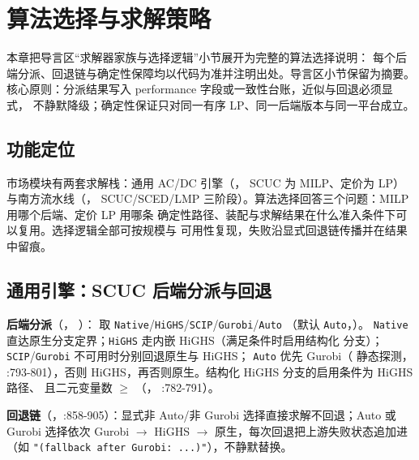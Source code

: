 \section{算法选择与求解策略}\label{sec:algorithm-selection}

\begin{theorynote}
本章把导言区“求解器家族与选择逻辑”小节展开为完整的算法选择说明：
每个后端分派、回退链与确定性保障均以代码为准并注明出处。导言区小节保留为摘要。
核心原则：分派结果写入 performance 字段或一致性台账，近似与回退必须显式，
不静默降级；确定性保证只对同一有序 LP、同一后端版本与同一平台成立。
\end{theorynote}

\subsection{功能定位}
市场模块有两套求解栈：通用 AC/DC 引擎（，
SCUC 为 MILP、定价为 LP）与南方流水线（，
SCUC/SCED/LMP 三阶段）。算法选择回答三个问题：MILP 用哪个后端、定价 LP 用哪条
确定性路径、装配与求解结果在什么准入条件下可以复用。选择逻辑全部可按规模与
可用性复现，失败沿显式回退链传播并在结果中留痕。

\subsection{通用引擎：SCUC 后端分派与回退}
\textbf{后端分派}（，
）： 取
\texttt{Native}/\texttt{HiGHS}/\texttt{SCIP}/\texttt{Gurobi}/\texttt{Auto}
（默认 \texttt{Auto}，）。
\texttt{Native} 直达原生分支定界；\texttt{HiGHS} 走内嵌 HiGHS（满足条件时启用结构化
分支）；\texttt{SCIP}/\texttt{Gurobi} 不可用时分别回退原生与 HiGHS；
\texttt{Auto} 优先 Gurobi（ 静态探测，
:793-801），否则 HiGHS，再否则原生。结构化 HiGHS 分支的启用条件为
HiGHS 路径、 且二元变量数 $\ge$
（，
:782-791）。

\textbf{回退链}（，:858-905）：显式非
Auto/非 Gurobi 选择直接求解不回退；Auto 或 Gurobi 选择依次
Gurobi $\to$ HiGHS $\to$ 原生，每次回退把上游失败状态追加进
（如 \texttt{"(fallback after Gurobi: ...)"}），不静默替换。

